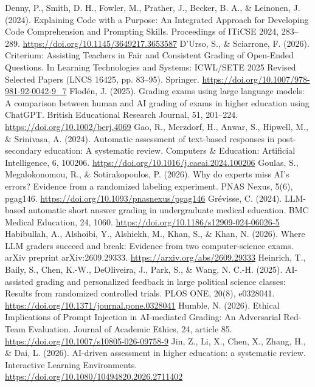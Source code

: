  Denny, P., Smith, D. H., Fowler, M., Prather, J., Becker, B. A., \& Leinonen, J. (2024). Explaining Code with a Purpose: An Integrated Approach for Developing Code Comprehension and Prompting Skills. Proceedings of ITiCSE 2024, 283--289. \url{https://doi.org/10.1145/3649217.3653587}
 D'Urso, S., \& Sciarrone, F. (2026). Criterium: Assisting Teachers in Fair and Consistent Grading of Open-Ended Questions. In Learning Technologies and Systems: ICWL/SETE 2025 Revised Selected Papers (LNCS 16425, pp. 83--95). Springer. \url{https://doi.org/10.1007/978-981-92-0042-9_7}
 Flod\'{e}n, J. (2025). Grading exams using large language models: A comparison between human and AI grading of exams in higher education using ChatGPT. British Educational Research Journal, 51, 201--224. \url{https://doi.org/10.1002/berj.4069}
 Gao, R., Merzdorf, H., Anwar, S., Hipwell, M., \& Srinivasa, A. (2024). Automatic assessment of text-based responses in post-secondary education: A systematic review. Computers \& Education: Artificial Intelligence, 6, 100206. \url{https://doi.org/10.1016/j.caeai.2024.100206}
 Goulas, S., Megalokonomou, R., \& Sotirakopoulos, P. (2026). Why do experts miss AI's errors? Evidence from a randomized labeling experiment. PNAS Nexus, 5(6), pgag146. \url{https://doi.org/10.1093/pnasnexus/pgag146}
 Gr\'evisse, C. (2024). LLM-based automatic short answer grading in undergraduate medical education. BMC Medical Education, 24, 1060. \url{https://doi.org/10.1186/s12909-024-06026-5}
 Habibullah, A., Alshoibi, Y., Alshiekh, M., Khan, S., \& Khan, N. (2026). Where LLM graders succeed and break: Evidence from two computer-science exams. arXiv preprint arXiv:2609.29333. \url{https://arxiv.org/abs/2609.29333}
 Heinrich, T., Baily, S., Chen, K.-W., DeOliveira, J., Park, S., \& Wang, N. C.-H. (2025). AI-assisted grading and personalized feedback in large political science classes: Results from randomized controlled trials. PLOS ONE, 20(8), e0328041. \url{https://doi.org/10.1371/journal.pone.0328041}
 Humble, N. (2026). Ethical Implications of Prompt Injection in AI-mediated Grading: An Adversarial Red-Team Evaluation. Journal of Academic Ethics, 24, article 85. \url{https://doi.org/10.1007/s10805-026-09758-9}
 Jin, Z., Li, X., Chen, X., Zhang, H., \& Dai, L. (2026). AI-driven assessment in higher education: a systematic review. Interactive Learning Environments. \url{https://doi.org/10.1080/10494820.2026.2711402}

